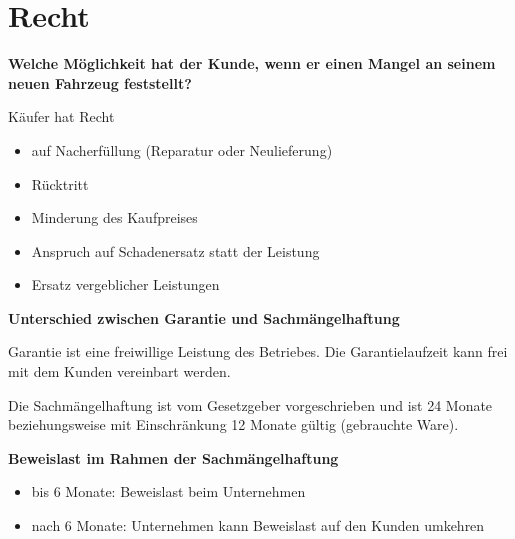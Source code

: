 \newpage

\section{Recht}\label{recht}

\textbf{Welche Möglichkeit hat der Kunde, wenn er einen Mangel an seinem
neuen Fahrzeug feststellt?}

Käufer hat Recht

\begin{itemize}
\item
  auf Nacherfüllung (Reparatur oder Neulieferung)
\item
  Rücktritt
\item
  Minderung des Kaufpreises
\item
  Anspruch auf Schadenersatz statt der Leistung
\item
  Ersatz vergeblicher Leistungen
\end{itemize}

\textbf{Unterschied zwischen Garantie und Sachmängelhaftung}

Garantie ist eine freiwillige Leistung des Betriebes. Die
Garantielaufzeit kann frei mit dem Kunden vereinbart werden.

Die Sachmängelhaftung ist vom Gesetzgeber vorgeschrieben und ist 24
Monate beziehungsweise mit Einschränkung 12 Monate gültig (gebrauchte
Ware).

\textbf{Beweislast im Rahmen der Sachmängelhaftung}

\begin{itemize}
\item
  bis 6 Monate: Beweislast beim Unternehmen
\item
  nach 6 Monate: Unternehmen kann Beweislast auf den Kunden umkehren
\end{itemize}

